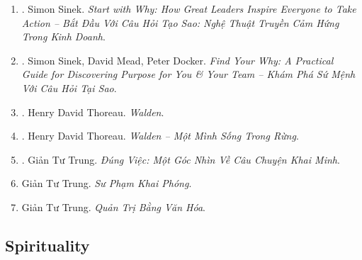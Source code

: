 \documentclass{article}
\begin{document}
\begin{enumerate}
	\item \cite{Sinek_start_why}. Simon Sinek. {\it Start with Why: How Great Leaders Inspire Everyone to Take Action -- Bắt Đầu Với Câu Hỏi Tạo Sao: Nghệ Thuật Truyền Cảm Hứng Trong Kinh Doanh}.\hfill{\sf[done]}
	\item \cite{Sinek_Mead_Docker_why}. Simon Sinek, David Mead, Peter Docker. {\it Find Your Why: A Practical Guide for Discovering Purpose for You \& Your Team -- Khám Phá Sứ Mệnh Với Câu Hỏi Tại Sao}.\hfill{\sf[done]}
	\item \cite{Thoreau2014}. Henry David Thoreau. {\it Walden}.\hfill{\sf[reading]}
	\item \cite{Thoreau2023}. Henry David Thoreau. {\it Walden -- Một Mình Sống Trong Rừng}.\hfill{\sf[done]}
	\item \cite{Trung_dung_viec}. Giản Tư Trung. {\it Đúng Việc: Một Góc Nhìn Về Câu Chuyện Khai Minh}.\hfill{\sf[done]}
	\item Giản Tư Trung. {\it Sư Phạm Khai Phóng}.
	\item Giản Tư Trung. {\it Quản Trị Bằng Văn Hóa}.
\end{enumerate}


\subsection{Spirituality}
\end{document}
